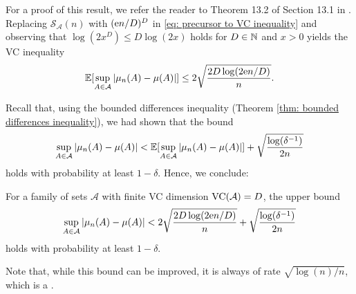 For a proof of this result, we refer the reader to Theorem 13.2 of Section 13.1 in \cite[p.~216]{devroye1996probabilistic}. Replacing $\mathcal{S}_{\mathcal{A}}(n)$ with $(\mathrm{e} n/D)^D$ in \eqref{eq: precursor to VC inequality} and observing that $\log(2x^D) \leq D \log(2x)$ holds for $D \in \mathbb{N}$ and $x > 0$ yields the VC inequality
\[
    \operatorname{\mathbb{E}}[\sup_{A \in \mathcal{A}} \abs{\mu_n(A) - \mu(A)}] \leq 2 \sqrt{\frac{2D \log(2 \mathrm{e} n / D)}{n}}.
\]

Recall that, using the bounded differences inequality (Theorem \ref{thm: bounded differences inequality}), we had shown that the bound
\[
    \sup_{A \in \mathcal{A}} \abs{\mu_n(A) - \mu(A)} < \operatorname{\mathbb{E}}[\sup_{A \in \mathcal{A}} \abs{\mu_n(A) - \mu(A)}] + \sqrt{\frac{\log(\delta^{-1})}{2n}}
\]
holds with probability at least $1 - \delta$. Hence, we conclude:

\begin{corollary}[VC Inequality]
For a family of sets $\mathcal{A}$ with finite VC dimension $\operatorname{VC}(\mathcal{A}) = D$, the upper bound
\[
    \sup_{A \in \mathcal{A}} \abs{\mu_n(A) - \mu(A)} < 2 \sqrt{\frac{2D \log(2 \mathrm{e} n / D)}{n}} + \sqrt{\frac{\log(\delta^{-1})}{2n}}
\]
holds with probability at least $1 - \delta$.
\end{corollary}

Note that, while this bound can be improved, it is always of rate $\sqrt{\log(n) / n}$, which is a .
